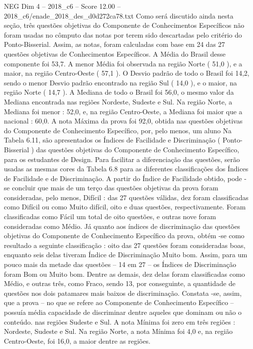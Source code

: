 \begin{textsample}{NEG Dim 4 – 2018\_c6 – Score 12.00 – 2018\_c6/enade\_2018\_des\_d0d272ca78.txt}
Como será discutido ainda nesta seção, três questões objetivas do Componente de Conhecimentos Específicos não foram usadas no cômputo das notas por terem sido descartadas pelo critério do Ponto-Bisserial.
Assim, as notas, foram calculadas com base em 24 das 27 questões objetivas de Conhecimentos Específicos.
A Média do Brasil desse componente foi 53,7.
A menor Média foi observada na região Norte ( 51,0 ), e a maior, na região Centro-Oeste ( 57,1 ).
O Desvio padrão de todo o Brasil foi 14,2, sendo o menor Desvio padrão encontrado na região Sul ( 14,0 ), e o maior, na região Norte ( 14,7 ).
A Mediana de todo o Brasil foi 56,0, o mesmo valor da Mediana encontrada nas regiões Nordeste, Sudeste e Sul.
Na região Norte, a Mediana foi menor : 52,0, e, na região Centro-Oeste, a Mediana foi maior que a nacional : 60,0.
A nota Máxima da prova foi 92,0, obtida nas questões objetivas do Componente de Conhecimento Específico, por, pelo menos, um aluno Na Tabela 6.11, são apresentados os Índices de Facilidade e Discriminação ( Ponto-Bisserial ) das questões objetivas do Componente de Conhecimento Específico, para os estudantes de Design.
Para facilitar a diferenciação das questões, serão usadas as mesmas cores da Tabela 6.8 para as diferentes classificações dos Índices de Facilidade e de Discriminação.
A partir do Índice de Facilidade obtido, pode -se concluir que mais de um terço das questões objetivas da prova foram consideradas, pelo menos, Difícil : das 27 questões válidas, dez foram classificadas como Difícil ou como Muito difícil, oito e duas questões, respectivamente.
Foram classificadas como Fácil um total de oito questões, e outras nove foram consideradas como Médio.
Já quanto aos índices de discriminação das questões objetivas do Componente de Conhecimento Específico da prova, obtém -se como resultado a seguinte classificação : oito das 27 questões foram consideradas boas, enquanto seis delas tiveram Índice de Discriminação Muito bom.
Assim, para um pouco mais da metade das questões – 14 em 27 – os Índices de Discriminação foram Bom ou Muito bom.
Dentre as demais, dez delas foram classificadas como Médio, e outras três, como Fraco, sendo 13, por conseguinte, a quantidade de questões nos dois patamares mais baixos de discriminação.
Constata -se, assim, que a prova – no que se refere ao Componente de Conhecimento Específico – possuía média capacidade de discriminar dentre aqueles que dominam ou não o conteúdo. nas regiões Sudeste e Sul.
A nota Mínima foi zero em três regiões : Nordeste, Sudeste e Sul.
Na região Norte, a nota Mínima foi 4,0 e, na região Centro-Oeste, foi 16,0, a maior dentre as regiões.

\end{textsample}
